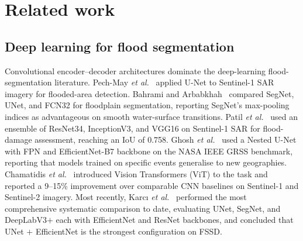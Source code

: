 
\section{Related work}
\label{sec:related}

\subsection{Deep learning for flood segmentation}
\label{sec:rw-flood}

Convolutional encoder--decoder architectures dominate the deep-learning flood-segmentation literature. Pech-May \emph{et al.}~\cite{pechmay2023flooded} applied U-Net to Sentinel-1 SAR imagery for flooded-area detection. Bahrami and Arbabkhah~\cite{bahrami2024enhanced} compared SegNet, UNet, and FCN32 for floodplain segmentation, reporting SegNet's max-pooling indices as advantageous on smooth water-surface transitions. Patil \emph{et al.}~\cite{patil2024flood} used an ensemble of ResNet34, InceptionV3, and VGG16 on Sentinel-1 SAR for flood-damage assessment, reaching an IoU of 0.758. Ghosh \emph{et al.}~\cite{ghosh2024automatic} used a Nested U-Net with FPN and EfficientNet-B7 backbone on the NASA IEEE GRSS benchmark, reporting that models trained on specific events generalise to new geographies. Chamatidis \emph{et al.}~\cite{chamatidis2024vision} introduced Vision Transformers (ViT) to the task and reported a 9--15\% improvement over comparable CNN baselines on Sentinel-1 and Sentinel-2 imagery. Most recently, Karc{\i} \emph{et al.}~\cite{karci2026deep} performed the most comprehensive systematic comparison to date, evaluating UNet, SegNet, and DeepLabV3$+$ each with EfficientNet and ResNet backbones, and concluded that UNet $+$ EfficientNet is the strongest configuration on FSSD.

